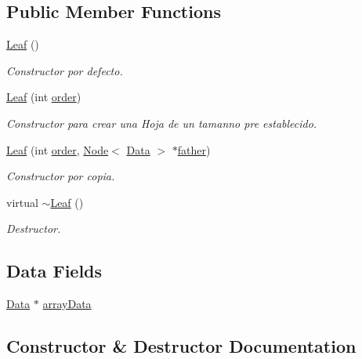 \subsection*{Public Member Functions}
\begin{DoxyCompactItemize}
\item 
\hyperlink{classLeaf_a455e433aabda9fc86ca01592188fade6}{Leaf} ()
\begin{DoxyCompactList}\small\item\em Constructor por defecto. \end{DoxyCompactList}\item 
\hyperlink{classLeaf_a58d1028691698747e42b279374825eca}{Leaf} (int \hyperlink{classNode_a672764de1b85ccfcb1c55429b5efbb1a}{order})
\begin{DoxyCompactList}\small\item\em Constructor para crear una Hoja de un tamanno pre establecido. \end{DoxyCompactList}\item 
\hyperlink{classLeaf_aa994510211d046a3b722c00c96e134a7}{Leaf} (int \hyperlink{classNode_a672764de1b85ccfcb1c55429b5efbb1a}{order}, \hyperlink{classNode}{Node}$<$ \hyperlink{main_8cpp_a0c209e815d35b218025a240523b4335b}{Data} $>$ $\ast$\hyperlink{classNode_ab8b577c94add9ebf4392c82301bcc49e}{father})
\begin{DoxyCompactList}\small\item\em Constructor por copia. \end{DoxyCompactList}\item 
virtual \hyperlink{classLeaf_a8ed11130cae158ab5eae6d2ed5502e52}{$\sim$\+Leaf} ()
\begin{DoxyCompactList}\small\item\em Destructor. \end{DoxyCompactList}\end{DoxyCompactItemize}
\subsection*{Data Fields}
\begin{DoxyCompactItemize}
\item 
\hyperlink{main_8cpp_a0c209e815d35b218025a240523b4335b}{Data} $\ast$ \hyperlink{classLeaf_a2ab8ad24d9d54d66b62e4ec4f89e32dc}{array\+Data}
\end{DoxyCompactItemize}


\subsection{Constructor \& Destructor Documentation}
